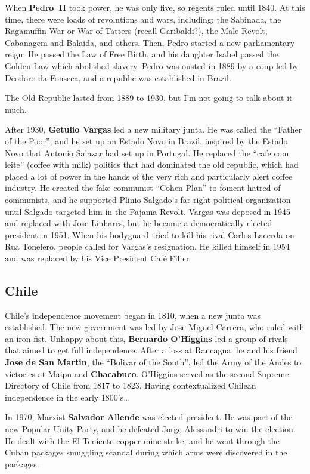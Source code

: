 When \textbf{Pedro~II} took power, he was only five, so regents ruled until 1840.
At this time, there were loads of revolutions and wars, including:
the Sabinada,
the Ragamuffin War or War of Tatters (recall Garibaldi?),
the Male Revolt,
Cabanagem and Balaida,
and others.
Then, Pedro started a new parliamentary reign.
He passed the Law of Free Birth, and his daughter Isabel passed the Golden Law which abolished slavery.
Pedro was ousted in 1889 by a coup led by Deodoro da Fonseca, and a republic was established in Brazil.

The Old Republic lasted from 1889 to 1930, but I'm not going to talk about it much.

After 1930, \textbf{Getulio Vargas} led a new military junta.
He was called the ``Father of the Poor'', and he set up an Estado Novo in Brazil,
inspired by the Estado Novo that Antonio Salazar had set up in Portugal.
He replaced the ``cafe com leite'' (coffee with milk) politics that had dominated the old republic,
which had placed a lot of power in the hands of the very rich and particularly alert coffee industry.
He created the fake communist ``Cohen Plan'' to foment hatred of communists,
and he supported Plinio Salgado's far-right political organization until Salgado targeted him in the Pajama Revolt.
Vargas was deposed in 1945 and replaced with Jose Linhares,
but he became a democratically elected president in 1951.
When his bodyguard tried to kill his rival Carlos Lacerda on Rua Tonelero, people called for Vargas's resignation.
He killed himself in 1954 and was replaced by his Vice President Caf\'e Filho.

\subsection*{Chile}

Chile's independence movement began in 1810, when a new junta was established.
The new government was led by Jose Miguel Carrera, who ruled with an iron fist.
Unhappy about this, \textbf{Bernardo O'Higgins} led a group of rivals that aimed to get full independence.
After a loss at Rancagua, he and his friend \textbf{Jose de San Martin}, the ``Bolivar of the South'',
led the Army of the Andes to victories at Maipu and \textbf{Chacabuco}.
O'Higgins served as the second Supreme Directory of Chile from 1817 to 1823.
Having contextualized Chilean independence in the early 1800's\ldots{}

In 1970, Marxist \textbf{Salvador Allende} was elected president.
He was part of the new Popular Unity Party, and he defeated Jorge Alessandri to win the election.
He dealt with the El Teniente copper mine strike,
and he went through the Cuban packages smuggling scandal during which arms were discovered in the packages.

